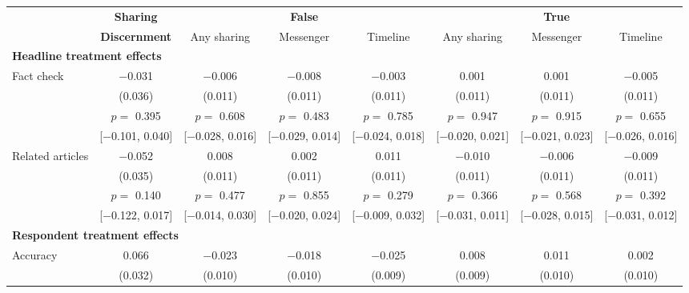 
\begin{tabular}[t]{lccccccc}
 & \textbf{Sharing} &  & \textbf{False} &  &  & \textbf{True} & \\
 & \textbf{Discernment} & Any sharing & Messenger & Timeline & Any sharing & Messenger & Timeline\\\cmidrule(lr){2-2} \cmidrule(lr){3-5} \cmidrule(lr){6-8} \multicolumn{4}{l}{\textbf{Headline treatment effects}} \rule{0pt}{1.2\normalbaselineskip}\\
\hspace{1em}Fact check & \num{-0.031} & \num{-0.006} & \num{-0.008} & \num{-0.003} & \num{0.001} & \num{0.001} & \num{-0.005}\\
 & (\num{0.036}) & (\num{0.011}) & (\num{0.011}) & (\num{0.011}) & (\num{0.011}) & (\num{0.011}) & (\num{0.011})\\
 & $p =$ \num{0.395} & $p =$ \num{0.608} & $p =$ \num{0.483} & $p =$ \num{0.785} & $p =$ \num{0.947} & $p =$ \num{0.915} & $p =$ \num{0.655}\\
 & {}[\num{-0.101}, \num{0.040}] & {}[\num{-0.028}, \num{0.016}] & {}[\num{-0.029}, \num{0.014}] & {}[\num{-0.024}, \num{0.018}] & {}[\num{-0.020}, \num{0.021}] & {}[\num{-0.021}, \num{0.023}] & {}[\num{-0.026}, \num{0.016}]\\
\hspace{1em}Related articles & \num{-0.052} & \num{0.008} & \num{0.002} & \num{0.011} & \num{-0.010} & \num{-0.006} & \num{-0.009}\\
 & (\num{0.035}) & (\num{0.011}) & (\num{0.011}) & (\num{0.011}) & (\num{0.011}) & (\num{0.011}) & (\num{0.011})\\
 & $p =$ \num{0.140} & $p =$ \num{0.477} & $p =$ \num{0.855} & $p =$ \num{0.279} & $p =$ \num{0.366} & $p =$ \num{0.568} & $p =$ \num{0.392}\\
 & {}[\num{-0.122}, \num{0.017}] & {}[\num{-0.014}, \num{0.030}] & {}[\num{-0.020}, \num{0.024}] & {}[\num{-0.009}, \num{0.032}] & {}[\num{-0.031}, \num{0.011}] & {}[\num{-0.028}, \num{0.015}] & {}[\num{-0.031}, \num{0.012}]\\\multicolumn{4}{l}{\textbf{Respondent treatment effects}} \rule{0pt}{1.2\normalbaselineskip}\\
\hspace{1em}Accuracy & \num{0.066} & \num{-0.023} & \num{-0.018} & \num{-0.025} & \num{0.008} & \num{0.011} & \num{0.002}\\
 & (\num{0.032}) & (\num{0.010}) & (\num{0.010}) & (\num{0.009}) & (\num{0.009}) & (\num{0.010}) & (\num{0.010})\\

\end{tabular}
